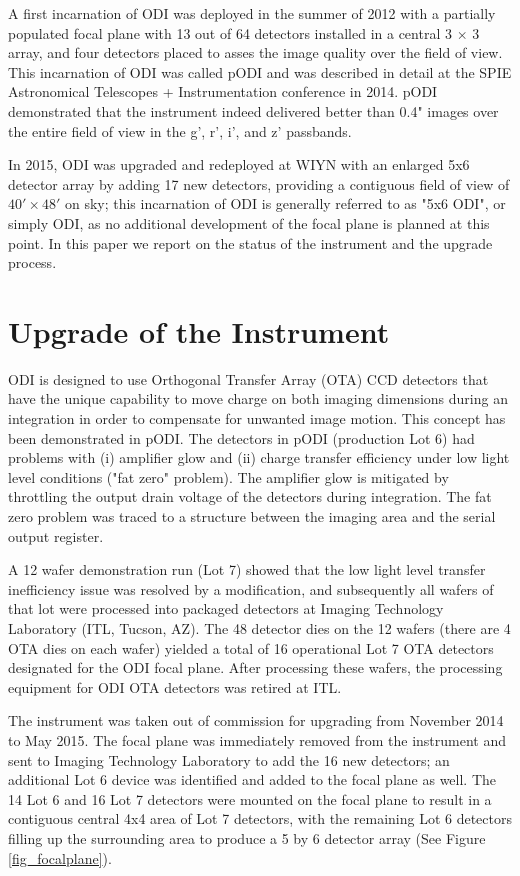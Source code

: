 \documentclass[]{spieman}
\begin{document}
A first incarnation of ODI was deployed in the summer of 2012 with a partially
populated focal plane with 13 out of 64 detectors installed in a central 3 $\times$
 3 array, and four detectors placed to asses the image quality over the field of view.
This incarnation of ODI was called pODI and was described in detail at the SPIE Astronomical
Telescopes + Instrumentation conference in 2014\cite{harbeck2014}. pODI
demonstrated that the instrument indeed delivered better than 0.4" images over
the entire field of view in the g', r', i', and z' passbands.

In 2015, ODI was upgraded and redeployed at WIYN  with an enlarged 5x6  detector
array by adding 17 new detectors, providing a contiguous field of view of $40' \times 48'$
on sky; this incarnation  of ODI is generally  referred to as "5x6 ODI", or simply
ODI, as no additional development of the focal plane is planned at this point.
In this paper we report on the status of the instrument and the upgrade process.


\section{Upgrade of the Instrument} 

ODI is designed to use Orthogonal Transfer Array (OTA) CCD detectors that have
the unique capability to move charge on both imaging dimensions during an
integration in order to compensate for unwanted image motion. This concept has
been demonstrated in pODI.  The detectors in pODI (production Lot 6) had
problems with (i) amplifier glow and (ii)  charge transfer efficiency under low
light level conditions ("fat zero" problem). The amplifier glow is mitigated by
throttling the output drain voltage of the detectors during integration. The fat
zero problem was traced to a structure between the imaging area and the serial
output register.

A  12 wafer demonstration run (Lot 7)  showed that the low light level transfer
inefficiency issue was resolved by a modification\cite{harbeck2014}, and subsequently
all
wafers of that lot were processed into packaged detectors at Imaging
Technology Laboratory (ITL, Tucson, AZ). The  48 detector dies on the 12 wafers 
(there are 4 OTA dies on each wafer) yielded a total of 16 operational Lot 7 
OTA detectors designated for the ODI focal plane. After processing
these wafers, the processing equipment for ODI OTA detectors was retired at
ITL.

The instrument was taken out of commission for upgrading from November 2014 to
May 2015. The focal plane was immediately removed from the instrument and sent
to  Imaging Technology Laboratory to add the 16 new
detectors; an additional Lot 6 device was identified and added to the focal
plane as well. The 14 Lot 6 and 16 Lot 7 detectors were mounted on the focal
plane to result in a contiguous central 4x4 area of Lot 7 detectors, with the remaining
Lot 6 detectors filling up the surrounding area to produce a 5 by 6 detector array 
(See Figure \ref{fig_focalplane}).
\end{document}
